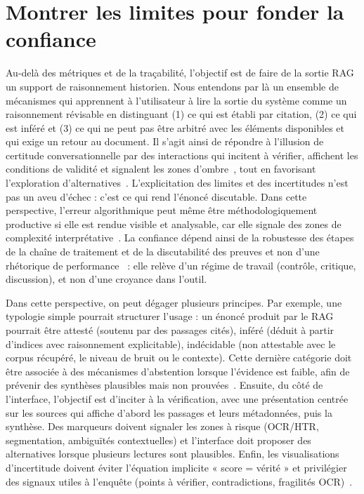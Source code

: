 \documentclass[final, fra]{anthology-ch}     %
\begin{document}
\section{Montrer les limites pour fonder la confiance}

Au-delà des métriques et de la traçabilité, l’objectif est de faire de la sortie RAG un support de raisonnement historien. Nous entendons par là un ensemble de mécanismes qui apprennent à l’utilisateur à lire la sortie du système comme un raisonnement révisable en distinguant (1) ce qui est établi par citation, (2) ce qui est inféré et (3) ce qui ne peut pas être arbitré avec les éléments disponibles et qui exige un retour au document. 
Il s’agit ainsi de répondre à l’illusion de certitude conversationnelle par des interactions qui incitent à vérifier, affichent les conditions de validité et signalent les zones d’ombre~\cite{vonreeken2025untrusting}, tout en favorisant l’exploration d’alternatives~\cite{ravi2025exploringtrust}. 
L’explicitation des limites et des incertitudes n’est pas un aveu d’échec : c’est ce qui rend l’énoncé discutable. Dans cette perspective, l’erreur algorithmique peut même être méthodologiquement productive si elle est rendue visible et analysable, car elle signale des zones de complexité interprétative~\cite{rettberg2022algorithmicfailure}. 
La confiance dépend ainsi de la robustesse des étapes de la chaîne de traitement et de la discutabilité des preuves et non d’une rhétorique de performance~\cite{da2019computationalcase} : elle relève d’un régime de travail (contrôle, critique, discussion), et non d’une croyance dans l’outil.

Dans cette perspective, on peut dégager plusieurs principes. Par exemple, une typologie simple pourrait structurer l’usage : un énoncé produit par le RAG pourrait être \og attesté \fg{} (soutenu par des passages cités), \og inféré \fg{} (déduit à partir d’indices avec raisonnement explicitable), \og indécidable \fg{} (non attestable avec le corpus récupéré, le niveau de bruit ou le contexte). 
Cette dernière catégorie doit être associée à des mécanismes d’abstention lorsque l’évidence est faible, afin de prévenir des synthèses plausibles mais non prouvées~\cite{ozaki2024confidenceRAG}. 
Ensuite, du côté de l’interface, l’objectif est d’inciter à la vérification, avec une présentation centrée sur les sources qui affiche d’abord les passages et leurs métadonnées, puis la synthèse. Des marqueurs doivent signaler les zones à risque (OCR/HTR, segmentation, ambiguïtés contextuelles) et l’interface doit proposer des alternatives lorsque plusieurs lectures sont plausibles. 
Enfin, les visualisations d’incertitude doivent éviter l’équation implicite « score = vérité » et privilégier des signaux utiles à l’enquête (points à vérifier, contradictions, fragilités OCR)~\cite{eberhard2023visualizationeffects}.
\end{document}
